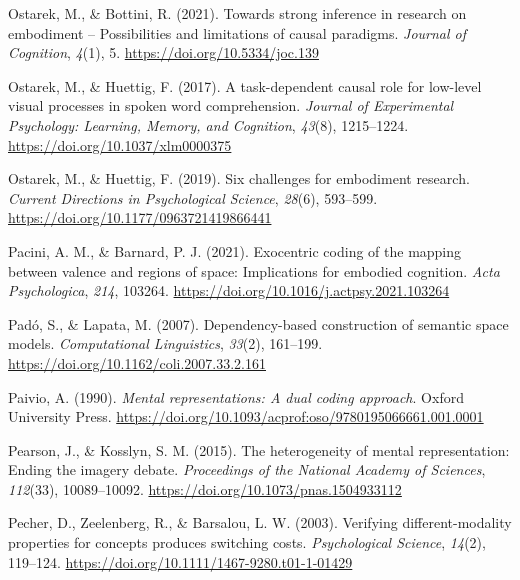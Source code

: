 \documentclass[
  12pt,
  man,floatsintext]{apa7}
\newlength{\cslhangindent}
\newlength{\cslentryspacingunit} %
\newenvironment{CSLReferences}[2] %
 {%
  \setlength{\parindent}{0pt}
  \ifodd #1
  \let\oldpar\par
  \def\par{\hangindent=\cslhangindent\oldpar}
  \fi
  \setlength{\parskip}{#2\cslentryspacingunit}
 }%
 {}
\begin{document}
\begin{CSLReferences}{1}{0}
\leavevmode{}%
Ostarek, M., \& Bottini, R. (2021). Towards strong inference in research on embodiment -- {Possibilities} and limitations of causal paradigms. \emph{Journal of Cognition}, \emph{4}(1), 5. \url{https://doi.org/10.5334/joc.139}

\leavevmode{}%
Ostarek, M., \& Huettig, F. (2017). A task-dependent causal role for low-level visual processes in spoken word comprehension. \emph{Journal of Experimental Psychology: Learning, Memory, and Cognition}, \emph{43}(8), 1215--1224. \url{https://doi.org/10.1037/xlm0000375}

\leavevmode{}%
Ostarek, M., \& Huettig, F. (2019). Six challenges for embodiment research. \emph{Current Directions in Psychological Science}, \emph{28}(6), 593--599. \url{https://doi.org/10.1177/0963721419866441}

\leavevmode{}%
Pacini, A. M., \& Barnard, P. J. (2021). Exocentric coding of the mapping between valence and regions of space: {Implications} for embodied cognition. \emph{Acta Psychologica}, \emph{214}, 103264. \url{https://doi.org/10.1016/j.actpsy.2021.103264}

\leavevmode{}%
Padó, S., \& Lapata, M. (2007). Dependency-based construction of semantic space models. \emph{Computational Linguistics}, \emph{33}(2), 161--199. \url{https://doi.org/10.1162/coli.2007.33.2.161}

\leavevmode{}%
Paivio, A. (1990). \emph{Mental representations: A dual coding approach}. {Oxford University Press}. \url{https://doi.org/10.1093/acprof:oso/9780195066661.001.0001}

\leavevmode{}%
Pearson, J., \& Kosslyn, S. M. (2015). The heterogeneity of mental representation: {Ending} the imagery debate. \emph{Proceedings of the National Academy of Sciences}, \emph{112}(33), 10089--10092. \url{https://doi.org/10.1073/pnas.1504933112}

\leavevmode{}%
Pecher, D., Zeelenberg, R., \& Barsalou, L. W. (2003). Verifying different-modality properties for concepts produces switching costs. \emph{Psychological Science}, \emph{14}(2), 119--124. \url{https://doi.org/10.1111/1467-9280.t01-1-01429}


\end{CSLReferences}
\end{document}
